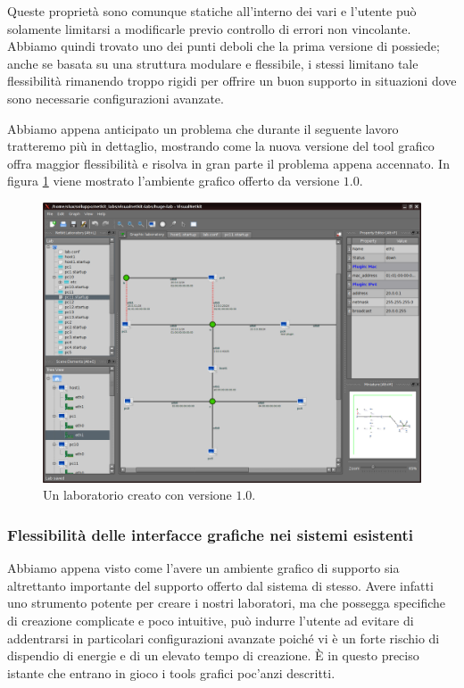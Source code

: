 Queste proprietà sono comunque statiche all'interno dei vari \plugin{} e l'utente può solamente limitarsi a modificarle previo controllo di errori non vincolante. Abbiamo quindi trovato uno dei punti deboli che la prima versione di \visualnetkit{} possiede; anche se basata su una struttura modulare e flessibile, i \plugin{} stessi limitano tale flessibilità rimanendo troppo rigidi per offrire un buon supporto in situazioni dove sono necessarie configurazioni avanzate.

Abbiamo appena anticipato un problema che durante il seguente lavoro tratteremo più in dettaglio, mostrando come la nuova versione del tool grafico offra maggior flessibilità e risolva in gran parte il problema appena accennato. In figura \ref{figura:vn_main_1} viene mostrato l'ambiente grafico offerto da \visualnetkit{} versione $1.0$.

\begin{figure}[!ht]
	\centering
	\includegraphics[width=12cm]{images/visualnetkit_main_1.png}
	\caption{Un laboratorio creato con \visualnetkit{} versione $1.0$.}
	\label{figura:vn_main_1}
\end{figure}

\subsubsection{Flessibilità delle interfacce grafiche nei sistemi esistenti}
Abbiamo appena visto come l'avere un ambiente grafico di supporto sia altrettanto importante del supporto offerto dal sistema di \emulazione{} stesso. Avere infatti uno strumento potente per creare i nostri laboratori, ma che possegga specifiche di creazione complicate e poco intuitive, può indurre l'utente ad evitare di addentrarsi in particolari configurazioni avanzate poiché vi è un forte rischio di dispendio di energie e di un elevato tempo di creazione.
È in questo preciso istante che entrano in gioco i tools grafici poc'anzi descritti.

